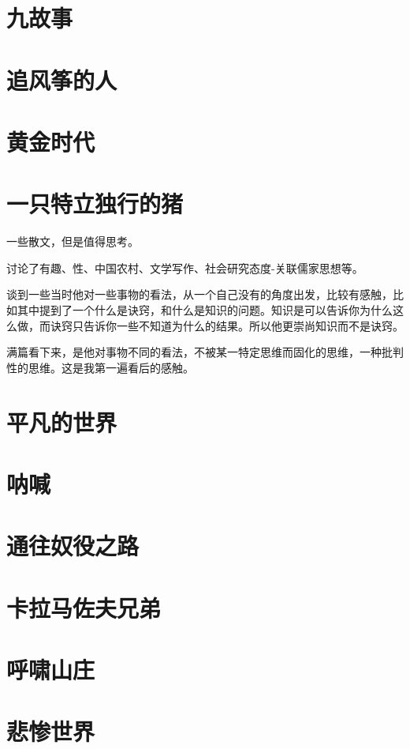 \documentclass[UTF8,a4paper,12pt]{ctexbook}
\begin{document}
	\section{九故事}
	
	\section{追风筝的人}
	
	\section{黄金时代}
	
	\section{一只特立独行的猪}
		一些散文，但是值得思考。
		
		讨论了有趣、性、中国农村、文学写作、社会研究态度-关联儒家思想等。
		
		谈到一些当时他对一些事物的看法，从一个自己没有的角度出发，比较有感触，比如其中提到了一个什么是诀窍，和什么是知识的问题。知识是可以告诉你为什么这么做，而诀窍只告诉你一些不知道为什么的结果。所以他更崇尚知识而不是诀窍。
		
		满篇看下来，是他对事物不同的看法，不被某一特定思维而固化的思维，一种批判性的思维。这是我第一遍看后的感触。
		
	\section{平凡的世界}
		
	\section{呐喊}
	
	\section{通往奴役之路}
	
	\section{卡拉马佐夫兄弟}
	
	\section{呼啸山庄}
	
	\section{悲惨世界}
	
\end{document}
